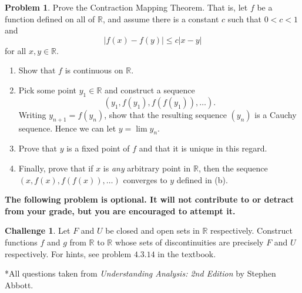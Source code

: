 \documentclass{amsart}
\newcommand{\+}[1]{\ensuremath{\mathbf{#1}}}
\newcommand{\R}{{\mathbb R}}
\theoremstyle{definition}
\newtheorem{prob}{Problem}
\newtheorem{chal}{Challenge}
\begin{document}
\begin{prob}
 Prove the Contraction Mapping Theorem.  That is,
 let $f$ be a function defined on all of $\R$, and assume there is a constant
 $c$ such that $0 < c < 1$ and
 \[|f(x) - f(y)| \leq c|x-y|\]
 for all $x,y \in \R$.
 \begin{enumerate}
  \item Show that $f$ is continuous on $\R$.
  \item Pick some point $y_1 \in \R$ and construct a sequence
  \[(y_1, f(y_1), f(f(y_1)), \ldots).\]
  Writing $y_{n+1} = f(y_n)$, show that the resulting sequence
  $(y_n)$ is a Cauchy sequence.  Hence we can let $y = \lim y_n$.
  \item Prove that $y$ is a fixed point of $f$ and that it is unique
  in this regard.
  \item Finally, prove that if $x$ is \emph{any} arbitrary point in $\R$,
  then the sequence $(x, f(x), f(f(x)), \ldots)$ converges to $y$ defined in (b).
 \end{enumerate}
\end{prob}




\vspace{5mm}

{\bf The following problem is optional.  It
will not contribute to or detract from your grade, but you are encouraged
to attempt it.}

\vspace{5mm}

\begin{chal}
Let $F$ and $U$ be closed and open sets in $\R$ respectively. 
Construct functions $f$ and $g$ from $\R$ to $\R$ whose
sets of discontinuities are precisely $F$ and $U$ respectively.
For hints, see problem $4.3.14$ in the textbook.
\end{chal}


\vspace{5mm}

*All questions taken from \emph{Understanding Analysis: 2nd Edition} by Stephen Abbott.
\end{document}
